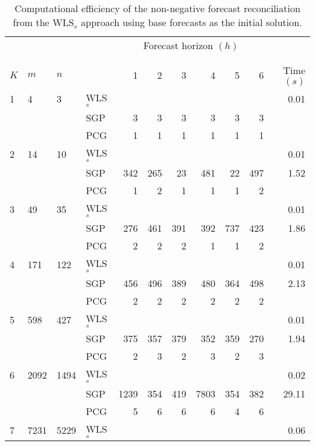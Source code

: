 \documentclass[11pt]{article}
\newcommand{\0}{\phantom{0}}
\begin{document}
\begin{table}[ht]
	\small
	\tabcolsep=0.20cm
	\caption{Computational efficiency of the non-negative forecast reconciliation from the WLS$_{s}$ approach using base forecasts as the initial solution.}
	\label{tbl:perfnnwlsb}
	\centering
	\begin{threeparttable}
		\begin{tabular}{llllrrrrrrr}
			\toprule
			& & & & \multicolumn{6}{c}{Forecast horizon $(h)$}\\[-0.3cm]\\\cline{5-10}\\[-0.3cm]
			$K$ & $m$ & $n$ & & 1 & 2 & 3 & 4 & 5 & 6 & Time $(s)$\\
			\midrule
			1 & 4 & 3 & WLS$_{s}$ & & & & & & & 0.01 \\
			& & & SGP & 3 & 3 & 3 & 3 & 3 & 3 & \bm{$0.04$} \\
			& & & PCG & 1 & 1 & 1 & 1 & 1 & 1 & \bm{$0.04$} \\
			\midrule
			2 & 14 & 10 & WLS$_{s}$ & & & & & & & 0.01\\
			& & & SGP & 342 & 265 & 23 & 481 & 22 & 497 & 1.52 \\
			& & & PCG & 1 & 2 & 1 & 1 & 1 & 2 & \bm{$0.10$} \\
			\midrule
			3 & 49 & 35 & WLS$_{s}$ & & & & & & & 0.01 \\
			& & & SGP & 276 & 461 & 391 & 392 & 737 & 423 & 1.86 \\
			& & & PCG & 2 & 2 & 2 & 1 & 1 & 2 & \bm{$0.17$} \\
			\midrule
			4 & 171 & 122 & WLS$_{s}$ & & & & & & & 0.01 \\
			& & & SGP & 456 & 496 & 389 & 480 & 364 & 498 & 2.13 \\
			& & & PCG & 2 & 2 & 2 & 2 & 2 & 2 & \bm{$0.29$} \\
			\midrule
			5 & 598 & 427 & WLS$_{s}$ & & & & & & & 0.01 \\
			& & & SGP & 375 & 357 & 379 & 352 & 359 & 270 & 1.94 \\
			& & & PCG & 2 & 3 & 2 & 3 & 2 & 3 & \bm{$0.33$} \\
			\midrule
			6 & 2092 & 1494 & WLS$_{s}$ & & & & & & & 0.02 \\
			& & & SGP & 1239 & 354 & 419 & 7803 & 354 & 382 & 29.11\\
			& & & PCG & 5 & 6 & 6 & 6 & 4 & 6 & \bm{$0.51$} \\
			\midrule
			7 & 7231 & 5229 & WLS$_{s}$ & & & & & & & 0.06 \\

\end{tabular}
\end{threeparttable}
\end{table}
\end{document}
